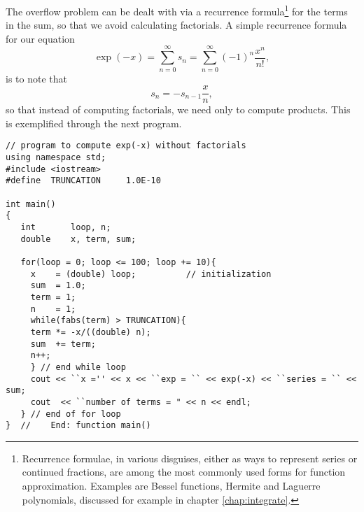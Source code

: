 The overflow problem can be dealt with via a recurrence 
formula\footnote{Recurrence formulae,
in various disguises, either as ways to represent series or continued
fractions, are among the most commonly used forms for function approximation.
Examples are Bessel functions, Hermite and Laguerre polynomials, discussed for example in chapter \ref{chap:integrate}.}
for the terms in the sum, so that we avoid calculating factorials. 
A simple recurrence formula for our equation
\[
\exp{(-x)}=\sum_{n=0}^{\infty}s_n=\sum_{n=0}^{\infty}(-1)^n\frac{x^n}{n!},
\]
is to note that
\[
s_n=-s_{n-1}\frac{x}{n},
\]
so that instead of computing factorials, we need only to compute 
products. This is exemplified through the next program.
\lstset{language=c++}
\begin{lstlisting}[title={\url{http://folk.uio.no/mhjensen/compphys/programs/chapter02/cpp/program5.cpp}}]
// program to compute exp(-x) without factorials
using namespace std;
#include <iostream>
#define  TRUNCATION     1.0E-10

int main()
{
   int       loop, n;
   double    x, term, sum;

   for(loop = 0; loop <= 100; loop += 10){
     x    = (double) loop;          // initialization 
     sum  = 1.0;
     term = 1;
     n    = 1;
     while(fabs(term) > TRUNCATION){
	 term *= -x/((double) n);
	 sum  += term;
	 n++;
     } // end while loop 
     cout << ``x ='' << x << ``exp = `` << exp(-x) << ``series = `` << sum;
     cout  << ``number of terms = " << n << endl;
   } // end of for loop 
}  //    End: function main() 
\end{lstlisting}
